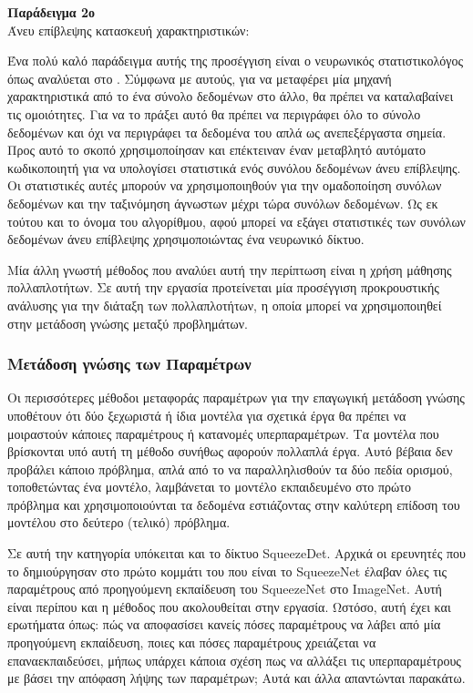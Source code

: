 \textbf{Παράδειγμα 2ο}\\
Άνευ επίβλεψης κατασκευή χαρακτηριστικών:

Ένα πολύ καλό παράδειγμα αυτής της προσέγγιση είναι ο νευρωνικός στατιστικολόγος όπως αναλύεται στο \cite{48}. 
Σύμφωνα με αυτούς, για να μεταφέρει μία μηχανή χαρακτηριστικά από το ένα σύνολο δεδομένων στο άλλο, θα πρέπει να καταλαβαίνει τις ομοιότητες. Για να το πράξει αυτό θα πρέπει να περιγράφει όλο το σύνολο δεδομένων και όχι να περιγράφει τα δεδομένα του απλά ως ανεπεξέργαστα σημεία. Προς αυτό το σκοπό χρησιμοποίησαν και επέκτειναν έναν μεταβλητό αυτόματο κωδικοποιητή \cite{49} για να υπολογίσει στατιστικά ενός συνόλου δεδομένων άνευ επίβλεψης. Οι στατιστικές αυτές μπορούν να χρησιμοποιηθούν για την ομαδοποίηση συνόλων δεδομένων και την ταξινόμηση άγνωστων μέχρι τώρα συνόλων δεδομένων. Ως εκ τούτου και το όνομα του αλγορίθμου, αφού μπορεί να εξάγει στατιστικές των συνόλων δεδομένων άνευ επίβλεψης χρησιμοποιώντας ένα νευρωνικό δίκτυο.

Μία άλλη γνωστή μέθοδος που αναλύει αυτή την περίπτωση είναι η χρήση μάθησης πολλαπλοτήτων.  Σε αυτή την εργασία \cite{50} προτείνεται μία προσέγγιση προκρουστικής ανάλυσης για την διάταξη των πολλαπλοτήτων, η οποία μπορεί να χρησιμοποιηθεί στην μετάδοση γνώσης μεταξύ προβλημάτων.

\subsubsection{Μετάδοση γνώσης των Παραμέτρων}
Οι περισσότερες μέθοδοι μεταφοράς παραμέτρων για την επαγωγική μετάδοση γνώσης υποθέτουν ότι δύο ξεχωριστά ή ίδια μοντέλα για σχετικά έργα θα πρέπει να μοιραστούν κάποιες παραμέτρους ή κατανομές υπερπαραμέτρων. Τα μοντέλα που βρίσκονται υπό αυτή τη μέθοδο συνήθως αφορούν πολλαπλά έργα. Αυτό βέβαια δεν προβάλει κάποιο πρόβλημα, απλά από το να παραλληλισθούν τα δύο πεδία ορισμού, τοποθετώντας ένα μοντέλο, λαμβάνεται το μοντέλο εκπαιδευμένο στο πρώτο πρόβλημα και χρησιμοποιούνται τα δεδομένα εστιάζοντας στην καλύτερη επίδοση του μοντέλου στο δεύτερο (τελικό) πρόβλημα. 

Σε αυτή την κατηγορία υπόκειται και το δίκτυο SqueezeDet. Αρχικά οι ερευνητές που το δημιούργησαν στο πρώτο κομμάτι του που είναι το SqueezeNet έλαβαν όλες τις παραμέτρους από προηγούμενη εκπαίδευση του SqueezeNet στο ImageNet. Αυτή είναι περίπου και η μέθοδος που ακολουθείται στην εργασία. Ωστόσο, αυτή έχει και ερωτήματα όπως: πώς να αποφασίσει κανείς πόσες παραμέτρους να λάβει από μία προηγούμενη εκπαίδευση, ποιες και πόσες παραμέτρους χρειάζεται να επαναεκπαιδεύσει, μήπως υπάρχει κάποια σχέση πως να αλλάξει τις υπερπαραμέτρους με βάσει την απόφαση λήψης των παραμέτρων; Αυτά και άλλα απαντώνται παρακάτω.


